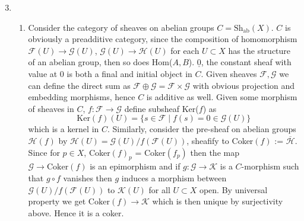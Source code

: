 \documentclass[10pt,a4paper]{article}
\begin{document}
\begin{enumerate}
\setcounter{enumi}{2}
\item \begin{enumerate}
\item Consider the category of sheaves on abelian groups $C = \text{Sh}_\text{ab}(X)$. $C$ is obviously a preadditive category, since the composition of homomorphism $\mathcal{F}(U)\to \mathcal{G}(U)$, $\mathcal{G}(U)\to \mathcal{H}(U)$ for each $U\subset X$ has the structure of an abelian group, then so does Hom($A,B$). $\underline{0}$, the constant sheaf with value at 0 is both a final and initial object in $C$. Given sheaves $\mathcal{F}, \mathcal{G}$ we can define the direct sum as $\mathcal{F}\oplus\mathcal{G}= \mathcal{F}\times\mathcal{G}$ with obvious projection and embedding morphisms, hence $C$ is additive as well. Given some morphism of sheaves in $C$, $f:\mathcal{F}\to \mathcal{G}$ define subsheaf Ker($f$) as
\[\text{Ker}(f)(U) = \{s\in \mathcal{F}\mid f(s)=0\in \mathcal{G}(U)\}\] which is a kernel in $C$. Similarly, consider the pre-sheaf on abelian groups $\mathcal{H}(f)$ by $\mathcal{H}(U) = \mathcal{G}(U)/f(\mathcal{F}(U))$, sheafify to Coker$(f)$ := $\overline{\mathcal{H}}$. Since for $p\in X$, Coker$(f)_p$ = Coker$(f_p)$ then the map $\mathcal{G}\to \text{Coker}(f)$ is an epimorphism and if $g:\mathcal{G}\to \mathcal{K}$ is a $C$-morphism such that $g\circ f$ vanishes then $g$ induces a morphism between $\mathcal{G}(U)/f(\mathcal{F}(U))$ to $\mathcal{K}(U)$ for all $U\subset X$ open. By universal property we get $\text{Coker}(f)\to \mathcal{K}$ which is then unique by surjectivity above. Hence it is a coker.\\


\end{enumerate}
\end{enumerate}
\end{document}
